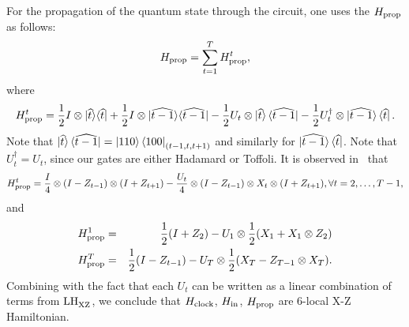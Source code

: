 For the propagation of the quantum state through the circuit, one uses the $H_{\mathrm{prop}}$ as follows: 
\begin{equation*} \label{eqn:Hprop}
    H_{\mathrm{prop}}=\sum_{t=1}^T H_{\mathrm{prop}}^t, 
\end{equation*}
where 
\begin{equation}
    H_{\mathrm{prop}}^t=\frac{1}{2}I\otimes|\widehat{t}\rangle\langle \widehat{t}|
	+\frac{1}{2}I\otimes|\widehat{t-1}\rangle\langle \widehat{t-1}|
	-\frac{1}{2} U_t\otimes\ket{\widehat{t}}\bra{\widehat{t-1}}
	-\frac{1}{2}U_t^\dagger\otimes\ket{\widehat{t-1}}\bra{\widehat{t}}.
\end{equation}
Note that $\ket{\widehat{t}}\bra{\widehat{t-1}}=\ket{110}\bra{100}_{(t-1,t,t+1)}$ and similarly for $\ket{\widehat{t-1}}\bra{\widehat{t}}$.
Note that $U_t^\dagger=U_t$, since our gates are either Hadamard or Toffoli. It is observed in~\cite{PhysRevA.78.012352} that 
\begin{equation}
   H_{\mathrm{prop}}^t=\frac{I}{4}\otimes(I-Z_{t-1})\otimes (I+Z_{t+1})-\frac{U_t}{4}\otimes(I-Z_{t-1})\otimes X_t\otimes (I+Z_{t+1}), \forall t=2, \ldots, T-1,
\end{equation}
and 
\begin{eqnarray}
  H_{\mathrm{prop}}^1 &= & \frac{1}{2}(I+Z_2)-U_1\otimes\frac{1}{2}(X_1+X_1\otimes Z_2) \\
  H_{\mathrm{prop}}^T &= & \frac{1}{2}(I-Z_{t-1})-U_T\otimes\frac{1}{2}(X_T-Z_{T-1}\otimes X_T).
\end{eqnarray}
% 	
Combining with the fact that each $U_t$ can be written as a linear combination of terms from $\mathrm{LH}_{\mathrm{XZ}}^{}$, we conclude that $H_{\mathrm{clock}}$, $H_{\mathrm{in}}$, $H_{\mathrm{prop}}$ are 6-local X-Z Hamiltonian. 

